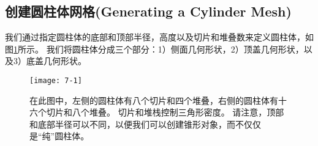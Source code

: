 \subsection{创建圆柱体网格(Generating a Cylinder Mesh)}
\begin{flushleft}
我们通过指定圆柱体的底部和顶部半径，高度以及切片和堆叠数来定义圆柱体，如图\ref{fig:7-1}所示。 我们将圆柱体分成三个部分：1）侧面几何形状，2）顶盖几何形状，以及3）底盖几何形状。
\end{flushleft}
\begin{figure}[h]
    \texttt{[image: 7-1]}
    \centering
    \caption{在此图中，左侧的圆柱体有八个切片和四个堆叠，右侧的圆柱体有十六个切片和八个堆叠。 切片和堆栈控制三角形密度。 请注意，顶部和底部半径可以不同，以便我们可以创建锥形对象，而不仅仅是“纯”圆柱体。}
    \label{fig:7-1}
\end{figure}

